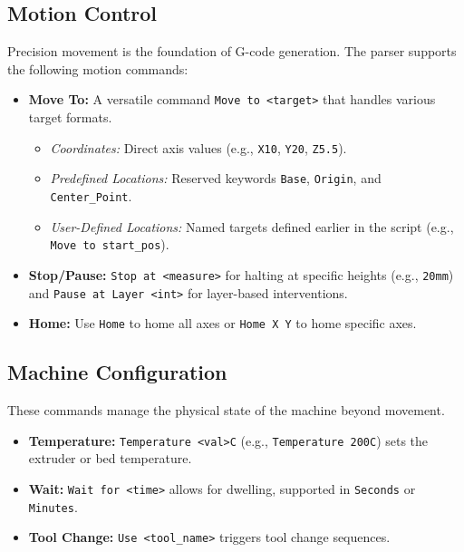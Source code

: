 \subsection{Motion Control}
Precision movement is the foundation of G-code generation. The parser supports the following motion commands:
\begin{itemize}
    \item \textbf{Move To:} A versatile command \texttt{Move to \textless target\textgreater} that handles various target formats.
    \begin{itemize}
        \item \textit{Coordinates:} Direct axis values (e.g., \texttt{X10}, \texttt{Y20}, \texttt{Z5.5}).
        \item \textit{Predefined Locations:} Reserved keywords \texttt{Base}, \texttt{Origin}, and \texttt{Center\_Point}.
        \item \textit{User-Defined Locations:} Named targets defined earlier in the script (e.g., \texttt{Move to start\_pos}).
    \end{itemize}
    \item \textbf{Stop/Pause:} \texttt{Stop at \textless measure\textgreater} for halting at specific heights (e.g., \texttt{20mm}) and \texttt{Pause at Layer \textless int\textgreater} for layer-based interventions.
    \item \textbf{Home:} Use \texttt{Home} to home all axes or \texttt{Home X Y} to home specific axes.
\end{itemize}

\subsection{Machine Configuration}
These commands manage the physical state of the machine beyond movement.
\begin{itemize}
    \item \textbf{Temperature:} \texttt{Temperature \textless val\textgreater C} (e.g., \texttt{Temperature 200C}) sets the extruder or bed temperature.
    \item \textbf{Wait:} \texttt{Wait for \textless time\textgreater} allows for dwelling, supported in \texttt{Seconds} or \texttt{Minutes}.
    \item \textbf{Tool Change:} \texttt{Use \textless tool\_name\textgreater} triggers tool change sequences.
\end{itemize}

